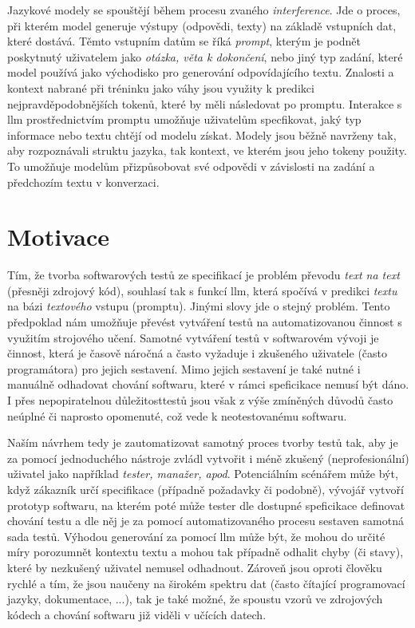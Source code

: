 \documentclass[czech, ma, kiv, he, iso690alph, pdf, viewonly]{fasthesis}
\begin{document}
    Jazykové modely se spouštějí během procesu zvaného \textit{interference}. Jde o proces, při kterém model generuje výstupy (odpovědi, texty) na základě vstupních dat, které dostává. Těmto vstupním datům se říká \textit{prompt}, kterým je podnět poskytnutý uživatelem jako \textit{otázka, věta k dokončení}, nebo jiný typ zadání, které model používá jako východisko pro generování odpovídajícího textu. Znalosti a kontext nabrané při tréninku jako váhy jsou využity k predikci nejpravděpodobnějších tokenů, které by měli následovat po promptu. Interakce s \Gls{llm} prostřednictvím promptu umožňuje uživatelům specfikovat, jaký typ informace nebo textu chtějí od modelu získat. Modely jsou běžně navrženy tak, aby rozpoznávali struktu jazyka, tak kontext, ve kterém jsou jeho tokeny použity. To umožňuje modelům přizpůsobovat své odpovědi v závislosti na zadání a předchozím textu v konverzaci. \cite{pasekprazak2022}

    \section{Motivace}

    Tím, že tvorba softwarových testů ze specifikací je problém převodu \emph{text na text} (přesněji zdrojový kód), souhlasí tak s funkcí  \Gls{llm}, která spočívá v predikci \emph{textu} na bázi \emph{textového} vstupu (promptu). Jinými slovy jde o stejný problém. Tento předpoklad nám umožňuje převést vytváření testů na automatizovanou činnost s využitím strojového učení. Samotné vytváření testů v softwarovém vývoji je činnost, která je časově náročná a často vyžaduje i zkušeného uživatele (často programátora) pro jejich sestavení. Mimo jejich sestavení je také nutné i manuálně odhadovat chování softwaru, které v rámci speficikace nemusí být dáno. I přes nepopiratelnou důležitosttestů jsou však z výše zmíněných důvodů často neúplné či naprosto opomenuté, což vede k neotestovanému softwaru.

    Naším návrhem tedy je zautomatizovat samotný proces tvorby testů tak, aby je za pomocí jednoduchého nástroje zvládl vytvořit i méně zkušený (neprofesionální) uživatel jako například \textit{tester, manažer, apod}. Potenciálním scénářem může být, když zákazník určí specifikace (případně požadavky či podobně), vývojář vytvoří prototyp softwaru, na kterém poté může tester dle dostupné speficikace definovat chování testu a dle něj je za pomocí automatizovaného procesu sestaven samotná sada testů. Výhodou generování za pomocí \Gls{llm} může být, že mohou do určité míry porozumnět kontextu textu a mohou tak případně odhalit chyby (či stavy), které by nezkušený uživatel nemusel odhadnout. Zároveň jsou oproti člověku rychlé a tím, že jsou naučeny na širokém spektru dat (často čítající programovací jazyky, dokumentace, ...), tak je také možné, že spoustu vzorů ve zdrojových kódech a chování softwaru již viděli v učících datech.
\end{document}
